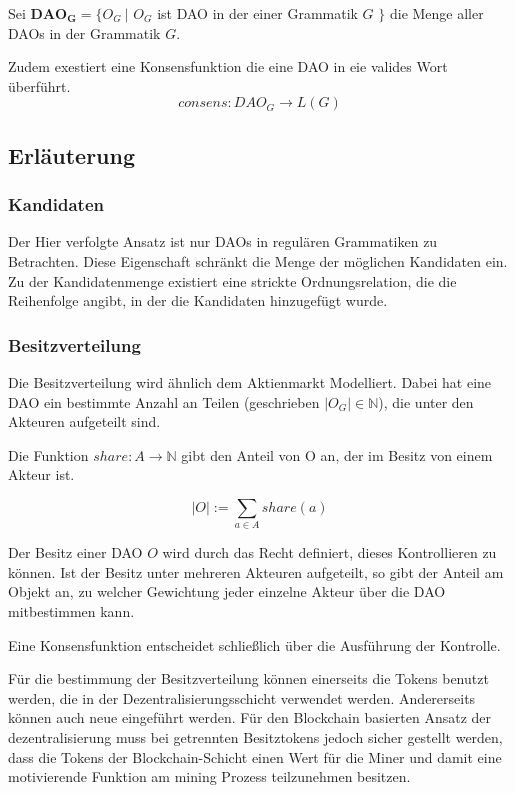 \documentclass[a4paper,12pt]{report}
\begin{document}
Sei $\mathbf{DAO_G} = \{ O_G\ |$ $O_G$ ist DAO in der einer Grammatik $G$ $\}$ die Menge aller DAOs in der Grammatik $G$.

Zudem exestiert eine Konsensfunktion die eine DAO in eie valides Wort überführt. 
  \[consens: DAO_G \rightarrow L(G)\] 


\subsection{Erläuterung}

\subsubsection*{Kandidaten}
Der Hier verfolgte Ansatz ist nur DAOs in regulären Grammatiken zu Betrachten. Diese Eigenschaft schränkt die Menge der möglichen Kandidaten ein. Zu der Kandidatenmenge existiert eine strickte Ordnungsrelation, die die Reihenfolge angibt, in der die Kandidaten hinzugefügt wurde.

\subsubsection*{Besitzverteilung}


Die Besitzverteilung wird ähnlich dem Aktienmarkt Modelliert. Dabei hat eine DAO ein bestimmte Anzahl an Teilen (geschrieben $|O_G| \in \mathbb{N}$), die unter den Akteuren aufgeteilt sind. 

Die Funktion $share: A \rightarrow \mathbb{N}$ gibt den Anteil von O an, der im Besitz von einem Akteur ist. 

\[ |O| := \sum_{a \in A} share(a) \] 

Der Besitz einer DAO $O$ wird durch das Recht definiert, dieses Kontrollieren zu können\cite{Waldron2004}. Ist der Besitz unter mehreren Akteuren aufgeteilt, so gibt der Anteil am Objekt an, zu welcher Gewichtung jeder einzelne Akteur über die DAO mitbestimmen kann.

Eine Konsensfunktion entscheidet schließlich über die Ausführung der Kontrolle.

Für die bestimmung der Besitzverteilung können einerseits die Tokens benutzt werden, die in der Dezentralisierungsschicht verwendet werden. Andererseits können auch neue eingeführt werden. Für den Blockchain basierten Ansatz der dezentralisierung muss bei getrennten Besitztokens jedoch sicher gestellt werden, dass die Tokens der Blockchain-Schicht einen Wert für die Miner und damit eine motivierende Funktion am mining Prozess teilzunehmen besitzen. 
\end{document}
